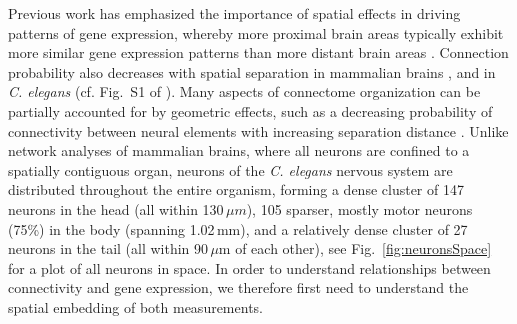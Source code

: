 \documentclass[10pt,letterpaper]{article}
\begin{document}
Previous work has emphasized the importance of spatial effects in driving patterns of gene expression, whereby more proximal brain areas typically exhibit more similar gene expression patterns than more distant brain areas \cite{Krienen2016, Fulcher:2016ck, Pantazatos:2016ir, Richiardi:2017hb}.
Connection probability also decreases with spatial separation in mammalian brains \cite{Henderson:2014fg, Horvat:2016ia, Wang:2016gg, Markov:2013jo, Fulcher:2016ck}, and in \emph{C. elegans} (cf. Fig.~S1 of \cite{Azulay:2016cg}).
Many aspects of connectome organization can be partially accounted for by geometric effects, such as a decreasing probability of connectivity between neural elements with increasing separation distance \cite{Henderson:2014fg, Roberts2016, Horvat:2016ia}.
Unlike network analyses of mammalian brains, where all neurons are confined to a spatially contiguous organ, neurons of the \emph{C. elegans} nervous system are distributed throughout the entire organism, forming a dense cluster of 147 neurons in the head (all within 130\,$\mu m$), 105 sparser, mostly motor neurons (75\%) in the body (spanning 1.02\,mm), and a relatively dense cluster of 27 neurons in the tail (all within 90\,$\mu$m of each other), see Fig.~\ref{fig:neuronsSpace} for a plot of all neurons in space.
In order to understand relationships between connectivity and gene expression, we therefore first need to understand the spatial embedding of both measurements.

\end{document}
